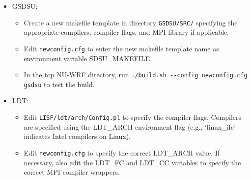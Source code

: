 \begin{itemize}
\begin{itemize}
  \item Inspect and edit \texttt{ARWpost/arch/configure.defaults} to ensure a 
    block exists for the desired operating system, hardware, and 
    compilers. Note that ARWPOST is serial only (no MPI support).

  \item Run \texttt{ARWpost/configure} at the command line to identify the 
    integer value of the appropriate build selection.

  \item Edit \texttt{newconfig.cfg} to enter the configure option as
    environment variable ARWPOST\_CONFIGURE\_OPT.

  \item In the top NU-WRF directory, run 
    \texttt{./build.sh -\--config \mbox{newconfig.cfg} arwpost} to test the 
    build.

  \end{itemize}

\item GSDSU:
  \begin{itemize}

  \item Create a new makefile template in directory \texttt{GSDSU/SRC/} 
    specifying the appropriate compilers, compiler flags, and MPI library 
    if applicable.

  \item Edit \texttt{newconfig.cfg} to enter the new makefile template
    name as environment variable SDSU\_MAKEFILE.

  \item In the top NU-WRF directory, run 
    \texttt{./build.sh -\--config \mbox{newconfig.cfg} gsdsu} to test the 
    build.

  \end{itemize}

\item LDT:
  \begin{itemize}

  \item Edit \texttt{LISF/ldt/arch/Config.pl} to specify the compiler flags. 
    Compilers are specified using the LDT\_ARCH environment flag (e.g.,
    `linux\_ifc' indicates Intel compilers on Linux).

  \item Edit \texttt{newconfig.cfg} to specify the correct LDT\_ARCH value.
    If necessary, also edit the LDT\_FC and LDT\_CC variables to specify the
    correct MPI compiler wrappers.


\end{itemize}
\end{itemize}
